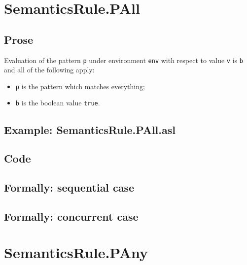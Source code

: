 \documentclass{book}
\begin{document}
\section{SemanticsRule.PAll \label{sec:SemanticsRule.PAll}}

  \subsection{Prose}
  Evaluation of the pattern \texttt{p} under environment \texttt{env} with
  respect to value \texttt{v} is \texttt{b} and all of the following apply:
  \begin{itemize}  
  \item \texttt{p} is the pattern which matches everything;
  \item \texttt{b} is the boolean value \texttt{true}.
  \end{itemize}

  \subsection{Example: SemanticsRule.PAll.asl}

  \subsection{Code}

\begin{emptyformal}
  \subsection{Formally: sequential case}

  \subsection{Formally: concurrent case}
\end{emptyformal}


\section{SemanticsRule.PAny \label{sec:SemanticsRule.PAny}}
\end{document}
